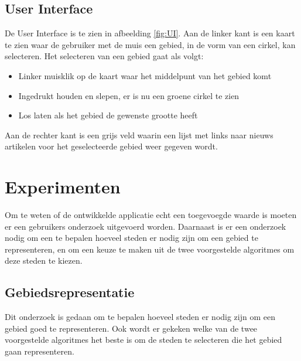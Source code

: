 \documentclass[twoside,openright]{uva-bachelor-thesis}
\begin{document}
		\section{User Interface}
		De User Interface is te zien in afbeelding \ref{fig:UI}. Aan de linker kant is een kaart te zien waar de gebruiker met de muis een gebied, in de vorm van een cirkel, kan selecteren. Het selecteren van een gebied gaat als volgt:
		\begin{itemize}
			\item Linker muisklik op de kaart waar het middelpunt van het gebied komt
			\item{Ingedrukt houden en slepen, er is nu een groene cirkel te zien}
			\item{Los laten als het gebied de gewenste grootte heeft}
		\end{itemize}
		Aan de rechter kant is een grijs veld waarin een lijst met links naar nieuws artikelen voor het geselecteerde gebied weer gegeven wordt.
\chapter{Experimenten}
	Om te weten of de ontwikkelde applicatie echt een toegevoegde waarde is moeten er een gebruikers onderzoek uitgevoerd worden. Daarnaast is er een onderzoek nodig om een te bepalen hoeveel steden er nodig zijn om een gebied te representeren, en om een keuze te maken uit de twee voorgestelde algoritmes om deze steden te kiezen.
	\section{Gebiedsrepresentatie}
	\label{sec:numcities}
		Dit onderzoek is gedaan om te bepalen hoeveel steden er nodig zijn om een gebied goed te representeren. Ook wordt er gekeken welke van de twee voorgestelde algoritmes het beste is om de steden te selecteren die het gebied gaan representeren.
\end{document}

